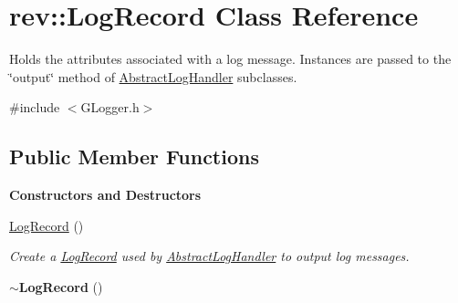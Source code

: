 \hypertarget{classrev_1_1_log_record}{}\section{rev\+::Log\+Record Class Reference}
\label{classrev_1_1_log_record}


Holds the attributes associated with a log message. Instances are passed to the \char`\"{}output\char`\"{} method of \mbox{\hyperlink{classrev_1_1_abstract_log_handler}{Abstract\+Log\+Handler}} subclasses.  




{\ttfamily \#include $<$G\+Logger.\+h$>$}

\subsection*{Public Member Functions}
\begin{Indent}\textbf{ Constructors and Destructors}\par
\begin{DoxyCompactItemize}
\item 
\mbox{\label{classrev_1_1_log_record_a679cb091532327c6f994baa1ab74630b}} 
\mbox{\hyperlink{classrev_1_1_log_record_a679cb091532327c6f994baa1ab74630b}{Log\+Record}} ()
\begin{DoxyCompactList}\small\item\em Create a \mbox{\hyperlink{classrev_1_1_log_record}{Log\+Record}} used by \mbox{\hyperlink{classrev_1_1_abstract_log_handler}{Abstract\+Log\+Handler}} to output log messages. \end{DoxyCompactList}\item 
\mbox{\label{classrev_1_1_log_record_a741c96a8bb238ae468da75c0fbb4697c}} 
{\bfseries $\sim$\+Log\+Record} ()
\end{DoxyCompactItemize}
\end{Indent}
